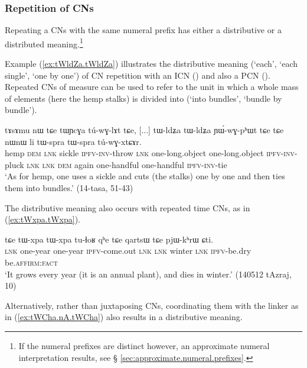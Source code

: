 \subsubsection{Repetition of CNs} \label{sec:CN.repetition}
Repeating a CNs with the same numeral prefix has either a distributive or a distributed meaning.\footnote{If the numeral prefixes are distinct however, an approximate numeral interpretation results, see § \ref{sec:approximate.numeral.prefixes}.}

Example (\ref{ex:tWldZa.tWldZa}) illustrates the distributive meaning (`each', `each single', `one by one') of CN repetition with an ICN () and also a PCN  (). Repeated CNs of measure can be used to refer to the unit in which a whole mass of elements (here the hemp stalks) is divided into (`into bundles', `bundle by bundle').

\begin{exe}
\ex \label{ex:tWldZa.tWldZa}
 \gll  tɤsɤmu nɯ tɕe tɯɲcɣa tú-wɣ-lɤt tɕe, [...] tɯ-ldʑa tɯ-ldʑa ɲɯ́-wɣ-pʰɯt tɕe tɕe nɯnɯ li tɯ-spra tɯ-spra tú-wɣ-xtɕɤr. \\
hemp \textsc{dem} \textsc{lnk} sickle \textsc{ipfv}-\textsc{inv}-throw \textsc{lnk} { } one-long.object one-long.object \textsc{ipfv}-\textsc{inv}-pluck \textsc{lnk} \textsc{lnk} \textsc{dem} again one-handful one-handful \textsc{ipfv}-\textsc{inv}-tie  \\
 \glt `As for hemp, one uses a sickle and cuts (the stalks) one by one and then ties them into bundles.'  (14-tasa, 51-43)
\end{exe}

The distributive meaning also occurs with repeated time CNs, as in (\ref{ex:tWxpa.tWxpa}).

\begin{exe}
\ex \label{ex:tWxpa.tWxpa}
 \gll tɕe tɯ-xpa tɯ-xpa tu-ɬoʁ qʰe tɕe qartsɯ tɕe pjɯ-kʰrɯ ɕti. \\
 \textsc{lnk} one-year one-year \textsc{ipfv}-come.out \textsc{lnk} \textsc{lnk} winter \textsc{lnk}  \textsc{ipfv}-be.dry be.\textsc{affirm}:\textsc{fact} \\
 \glt  `It grows every year (it is an annual plant), and dies in winter.' (140512 tAzraj, 10)
\end{exe}

Alternatively, rather than juxtaposing CNs, coordinating them with the linker  as in (\ref{ex:tWCha.nA.tWCha}) also results in a distributive meaning.

